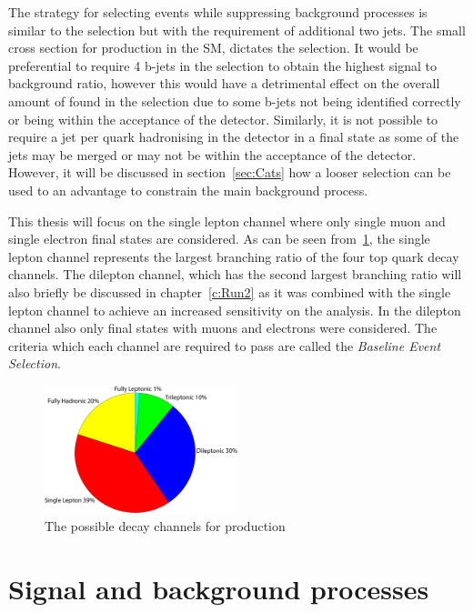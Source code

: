 The strategy for selecting \tttt events while suppressing background processes is similar to the \ttbar selection but with the requirement of additional two jets. The small cross section for \tttt production in the SM,  dictates the selection. It would be preferential to require 4 b-jets in the selection to obtain the highest signal to background ratio, however this would have a detrimental effect on the overall amount of \tttt found in the selection due to some b-jets not being identified correctly or being within the acceptance of the detector. Similarly, it is not possible to require a jet per quark hadronising in the detector in a \tttt final state as some of the jets may be merged or may not be within the acceptance of the detector. However, it will be discussed in section~\ref{sec:Cats} how a looser selection can be used to an advantage to constrain the main background process.

This thesis will focus on the single lepton channel where only single muon and single electron final states are considered. As can be seen from~\ref{fig:ttttDecay}, the single lepton channel represents the largest branching ratio of the four top quark decay channels. The dilepton channel, which has the second largest branching ratio will also briefly be discussed in chapter~\ref{c:Run2} as it was combined with the single lepton channel to achieve an increased sensitivity on the analysis. In the dilepton channel also only final states with muons and electrons were considered. The criteria which each channel are required to pass are called the \emph{Baseline Event Selection}.

\begin{figure}[ht!]
\centering
    \includegraphics[width=0.5\textwidth]{images/Analysis/FourTopBR.pdf}
    \caption{The possible decay channels for \tttt production}
    \label{fig:ttttDecay}
\end{figure}

\section{Signal and background processes}
\label{sec:sigback}


